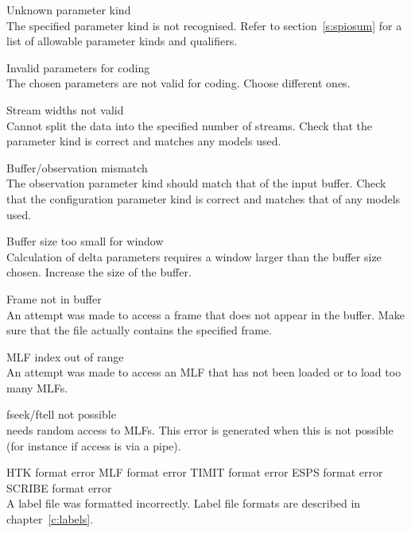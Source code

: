 \begin{itemize}
\begin{itemize}
    Unknown parameter kind\\
        The specified parameter kind is not recognised.  Refer to 
        section~\ref{s:spiosum} for a list of allowable parameter kinds
        and qualifiers.

    Invalid parameters for coding\\
        The chosen parameters are not valid for coding.  Choose different ones.

    Stream widths not valid\\
        Cannot split the data into the specified number of streams.  Check that
        the parameter kind is correct and matches any models used.

    Buffer/observation mismatch\\
        The observation parameter kind should match that of the input buffer.
        Check that the configuration parameter kind is correct and matches 
        that of any models used.

    Buffer size too small for window\\
        Calculation of delta parameters requires a window larger than the
        buffer size chosen.  Increase the size of the buffer.

    Frame not in buffer\\
        An attempt was made to access a frame that does not appear in the 
        buffer.  Make sure that the file actually contains the specified frame.

\end{itemize}


\begin{itemize}
    MLF index out of range\\
        An attempt was made to access an MLF that has not been loaded or to 
        load too many MLFs.

    fseek/ftell not possible\\
         needs random access to MLFs.  This error is generated
        when this is not possible (for instance if access is via a pipe).

    HTK format error
    MLF format error
    TIMIT format error
 ESPS format error
    SCRIBE format error\\
        A label file was formatted incorrectly.  Label
        file formats are described in chapter~\ref{c:labels}.


\end{itemize}
\end{itemize}
